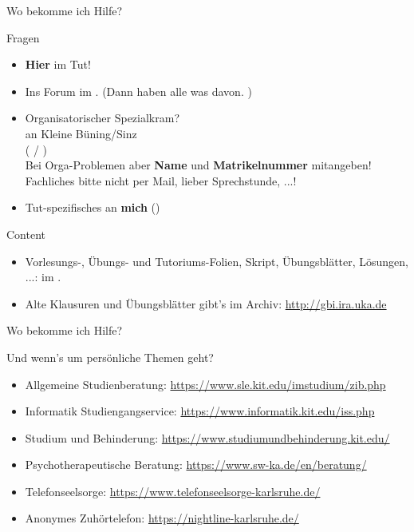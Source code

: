 \begin{frame}{Wo bekomme ich Hilfe?}	
	\begin{block}{Fragen}
		\begin{itemize}
			\item \textbf{Hier} im Tut!
			\item Ins Forum im \ILIAS. (Dann haben alle was davon. \smiley) \\
			\pause
			\item Organisatorischer Spezialkram? \\
				  \impl an Kleine Büning/Sinz \\
						( / ) \\
				  Bei Orga-Problemen aber \textbf{Name} und \textbf{Matrikelnummer}  mitangeben! \\
				  Fachliches bitte nicht per Mail, lieber \impl Sprechstunde, \ILIAS...!
			\item Tut-spezifisches an \textbf{mich} (\mailto{\mymail})
		\end{itemize}
	\end{block}
	\pause
	\begin{block}{Content}
		\begin{itemize}
			\item Vorlesungs-, Übungs- und Tutoriums-Folien, Skript, Übungsblätter, Lösungen, ...: im \ILIAS.
			\item Alte Klausuren und Übungsblätter gibt's im Archiv: \url{http://gbi.ira.uka.de}
		\end{itemize}
	\end{block}
\end{frame}

\begin{frame}{Wo bekomme ich Hilfe?}	
	\begin{block}{Und wenn's um persönliche Themen geht?}
		\begin{itemize}
			\item Allgemeine Studienberatung: \url{https://www.sle.kit.edu/imstudium/zib.php}
			\item Informatik Studiengangservice: \url{https://www.informatik.kit.edu/iss.php}
			\item Studium und Behinderung: \url{https://www.studiumundbehinderung.kit.edu/}
			\item Psychotherapeutische Beratung: \url{https://www.sw-ka.de/en/beratung/}
			\item Telefonseelsorge: \url{https://www.telefonseelsorge-karlsruhe.de/}
			\item Anonymes Zuhörtelefon: \url{https://nightline-karlsruhe.de/}
		\end{itemize}
	\end{block}
\end{frame}

